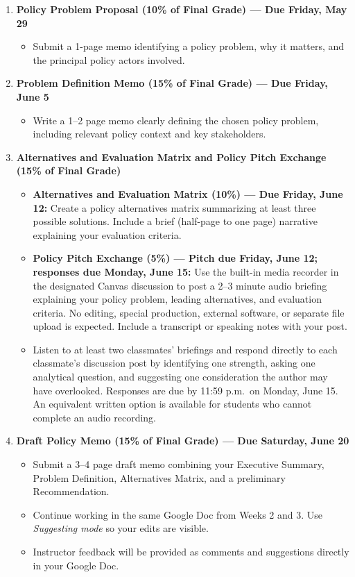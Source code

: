 \documentclass[12pt]{article}
\begin{document}
\begin{enumerate}
    \item \textbf{Policy Problem Proposal (10\% of Final Grade) --- Due Friday, May 29}
    \begin{itemize}
        \item Submit a 1-page memo identifying a policy problem, why it matters, and the principal policy actors involved.
    \end{itemize}

    \item \textbf{Problem Definition Memo (15\% of Final Grade) --- Due Friday, June 5}
    \begin{itemize}
        \item Write a 1--2 page memo clearly defining the chosen policy problem, including relevant policy context and key stakeholders.
    \end{itemize}

    \item \textbf{Alternatives and Evaluation Matrix and Policy Pitch Exchange (15\% of Final Grade)}
    \begin{itemize}
        \item \textbf{Alternatives and Evaluation Matrix (10\%) --- Due Friday, June 12:} Create a policy alternatives matrix summarizing at least three possible solutions. Include a brief (half-page to one page) narrative explaining your evaluation criteria.
        \item \textbf{Policy Pitch Exchange (5\%) --- Pitch due Friday, June 12; responses due Monday, June 15:} Use the built-in media recorder in the designated Canvas discussion to post a 2--3 minute audio briefing explaining your policy problem, leading alternatives, and evaluation criteria. No editing, special production, external software, or separate file upload is expected. Include a transcript or speaking notes with your post.
        \item Listen to at least two classmates' briefings and respond directly to each classmate's discussion post by identifying one strength, asking one analytical question, and suggesting one consideration the author may have overlooked. Responses are due by 11:59 p.m.\ on Monday, June 15. An equivalent written option is available for students who cannot complete an audio recording.
    \end{itemize}

    \item \textbf{Draft Policy Memo (15\% of Final Grade) --- Due Saturday, June 20}
    \begin{itemize}
        \item Submit a 3--4 page draft memo combining your Executive Summary, Problem Definition, Alternatives Matrix, and a preliminary Recommendation.
        \item Continue working in the same Google Doc from Weeks 2 and 3. Use \emph{Suggesting mode} so your edits are visible.
        \item Instructor feedback will be provided as comments and suggestions directly in your Google Doc.
    \end{itemize}


\end{enumerate}
\end{document}
